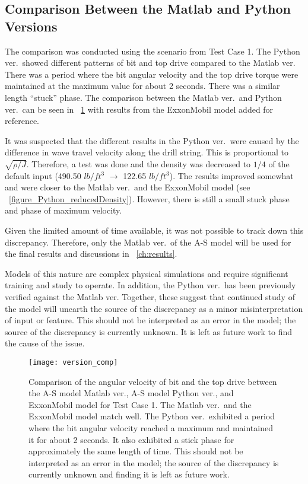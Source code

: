 \subsection{Comparison Between the Matlab and Python Versions}
The comparison was conducted using the scenario from Test Case 1. The Python ver.\ showed different patterns of bit and top drive compared to the Matlab ver. There was a period where the bit angular velocity and the top drive torque were maintained at the maximum value for about 2 seconds. There was a similar length ``stuck'' phase. The comparison between the Matlab ver.\ and Python ver.\ can be seen in \figurename~\ref{figure_Test1_comp_chASmodel} with results from the ExxonMobil model added for reference.

It was suspected that the different results in the Python ver.\ were caused by the difference in wave travel velocity along the drill string. This is proportional to $\sqrt{\rho/J}$.  Therefore, a test was done and the density was decreased to $1/4$ of the default input (490.50 $lb/ft^3$ $\rightarrow$ 122.65 $lb/ft^3$). The results improved somewhat and were closer to the Matlab ver.\ and the ExxonMobil model (see \figurename~\ref{figure_Python_reducedDensity}). However, there is still a small stuck phase and phase of maximum velocity.

Given the limited amount of time available, it was not possible to track down this discrepancy. Therefore, only the Matlab ver.\ of the A-S model will be used for the final results and discussions in \chaptername~\ref{ch:results}.

Models of this nature are complex physical simulations and require significant training and study to operate. In addition, the Python ver.\ has been previously verified against the Matlab ver. Together, these suggest that continued study of the model will unearth the source of the discrepancy as a minor misinterpretation of input or feature. This should not be interpreted as an error in the model; the source of the discrepancy is currently unknown. It is left as future work to find the cause of the issue.

\begin{figure}
  \centering
  \texttt{[image: version\_comp]}
  \caption[Comparison between different models for Test Case 1]{Comparison of the angular velocity of bit and the top drive between the A-S model Matlab ver., A-S model Python ver., and ExxonMobil model for Test Case 1. The Matlab ver.\ and the ExxonMobil model match well. The Python ver.\ exhibited a period where the bit angular velocity reached a maximum and maintained it for about 2 seconds. It also exhibited a stick phase for approximately the same length of time. This should not be interpreted as an error in the model; the source of the discrepancy is currently unknown and finding it is left as future work.}
  \label{figure_Test1_comp_chASmodel}
\end{figure}

